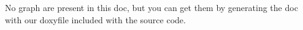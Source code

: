 No graph are present in this doc, but you can get them by generating the doc with our doxyfile included with the source code. 